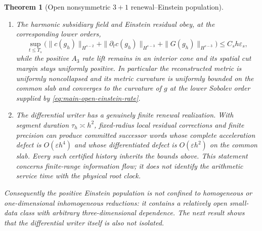 \documentclass[11pt]{article}
\newtheorem{theorem}{Theorem}[section]
\theoremstyle{definition}
\theoremstyle{remark}
\begin{document}
\begin{theorem}[Open nonsymmetric $3+1$ renewal--Einstein population]
\begin{enumerate}[label=\textup{(O\arabic*)},leftmargin=3em]
      Here $g_h$ denotes the canonical interpolation of $\eta+q_h$.
\item The harmonic subsidiary field and Einstein residual obey, at the
      corresponding lower orders,
      \begin{equation}
       \sup_{t\le T_s}
       \bigl(\|c(g_h)\|_{H^{s-2}}+\|\partial_tc(g_h)\|_{H^{s-3}}
                  +\|G(g_h)\|_{H^{s-3}}\bigr)
       \le C_sh\varepsilon_s,
       \label{eq:main-open-subsidiary}
      \end{equation}
      while the positive $A_3$ rate lift remains in an interior cone and its
      spatial cut margin stays uniformly positive.  In particular the
      reconstructed metric is uniformly noncollapsed and its metric curvature
      is uniformly bounded on the common slab and converges to the curvature
      of $g$ at the lower Sobolev order supplied by
      \eqref{eq:main-open-einstein-rate}.
\item The differential writer has a genuinely finite renewal realization.
      With segment duration $\tau_h\asymp h^2$, fixed-radius local residual
      corrections and finite precision can produce committed successor words
      whose complete acceleration defect is $O(\varepsilon h^4)$ and whose
      differentiated defect is $O(\varepsilon h^2)$ on the common slab.
      Every such certified history inherits the bounds above.  This statement
      concerns finite-range information flow; it does not identify the
      arithmetic service time with the physical root clock.
\end{enumerate}
Consequently the positive Einstein population is not confined to homogeneous
or one-dimensional inhomogeneous reductions: it contains a relatively open
small-data class with arbitrary three-dimensional dependence.  The next
result shows that the differential writer itself is also not isolated.
\end{theorem}
\end{document}
